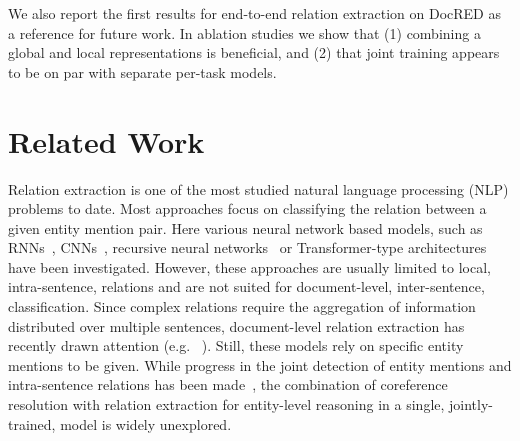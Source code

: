\documentclass[11pt,a4paper]{article}
\begin{document}
We also report the first results for end-to-end relation extraction on DocRED as a reference for future work. In ablation studies we show that (1) combining a global and local representations is beneficial, and (2) that joint training appears to be on par with separate per-task models.

\section{Related Work}
Relation extraction is one of the most studied natural language processing (NLP) problems to date. Most approaches focus on classifying the relation between a given entity mention pair. Here various neural network based models, such as RNNs~\cite{zhang:2015:rel_pos}, CNNs~\cite{zeng:2014:rel_cnn}, recursive neural networks~\cite{socher:2012:mv_rnn} or Transformer-type architectures~\cite{wu:2019:semeval_bert} have been investigated. However, these approaches are usually limited to local, intra-sentence, relations and are not suited for document-level, inter-sentence, classification. Since complex relations require the aggregation of information distributed over multiple sentences, document-level relation extraction has recently drawn attention (e.g. ~\citealt{quirk:2017:distant_intra_sentence_re,verga:2018:multi_instance,gupta:2019:intra_inter_re,yao:2019:docred}). Still, these models rely on specific entity mentions to be given. While progress in the joint detection of entity mentions and intra-sentence relations has been made~\cite{gupta:2016:table_filling, bekoulis:2018:multi_head, luan:2018:scierc}, the combination of coreference resolution with relation extraction for entity-level reasoning in a single, jointly-trained, model is widely unexplored. 
\end{document}
